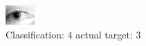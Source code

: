 \begin{figure}[h!]
\begin{center}
\includegraphics[width=0.60\columnwidth]{figures/ID1270_class_4_target_3.png}
\end{center}
\caption{ Classification: 4 actual target: 3}
\label{fig:ID1270_class_4_target_3}
\end{figure}
